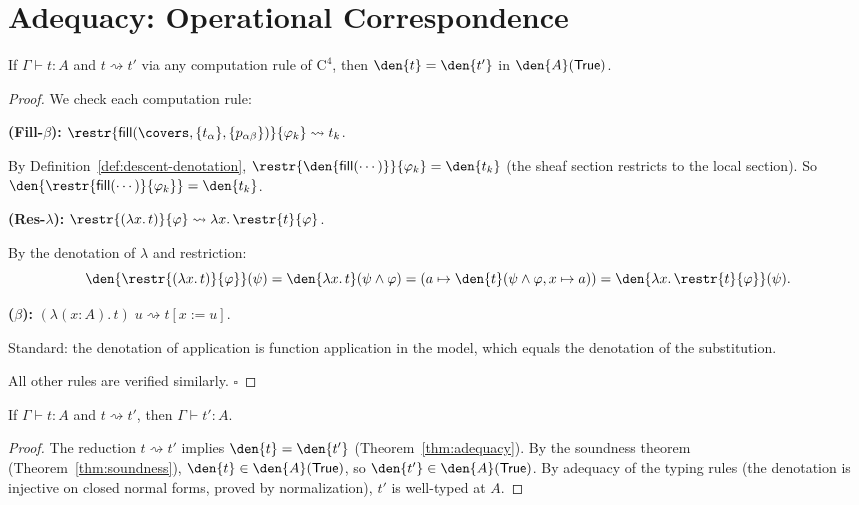 \section{Adequacy: Operational Correspondence}
\label{sec:adequacy}

\begin{theorem}
\label{thm:adequacy}
If \(\Gamma \vdash t : A\) and \(t \rightsquigarrow t'\)
via any computation rule of \(\mathrm{C}^4\), then
\(\den{t} = \den{t'}\) in \(\den{A}(\mathsf{True})\).
\end{theorem}

\begin{proof}
We check each computation rule:

\medskip\noindent
\textbf{(Fill-\(\beta\)):}
\(\restr{\mathsf{fill}(\covers, \{t_\alpha\}, \{p_{\alpha\beta}\})}{\varphi_k}
\rightsquigarrow t_k\).

By Definition~\ref{def:descent-denotation},
\(\restr{\den{\mathsf{fill}(\cdots)}}{\varphi_k}
= \den{t_k}\) (the sheaf section restricts to the local section).
So \(\den{\restr{\mathsf{fill}(\cdots)}{\varphi_k}} = \den{t_k}\).

\medskip\noindent
\textbf{(Res-\(\lambda\)):}
\(\restr{(\lambda x.\, t)}{\varphi}
\rightsquigarrow \lambda x.\, \restr{t}{\varphi}\).

By the denotation of \(\lambda\) and restriction:
\[
  \den{\restr{(\lambda x.\, t)}{\varphi}}(\psi) =
  \den{\lambda x.\, t}(\psi \wedge \varphi) =
  (a \mapsto \den{t}(\psi \wedge \varphi, x \mapsto a)) =
  \den{\lambda x.\, \restr{t}{\varphi}}(\psi).
\]

\medskip\noindent
\textbf{(\(\beta\)):}
\((\lambda(x : A).\, t)\; u \rightsquigarrow t[x := u]\).

Standard: the denotation of application is function application
in the model, which equals the denotation of the substitution.

\medskip\noindent
All other rules are verified similarly.  \hfill\(\square\)
\end{proof}

\begin{corollary}
\label{cor:subject-reduction}
If \(\Gamma \vdash t : A\) and \(t \rightsquigarrow t'\), then
\(\Gamma \vdash t' : A\).
\end{corollary}

\begin{proof}
The reduction \(t \rightsquigarrow t'\) implies \(\den{t} = \den{t'}\)
(Theorem~\ref{thm:adequacy}).  By the soundness theorem
(Theorem~\ref{thm:soundness}), \(\den{t} \in \den{A}(\mathsf{True})\),
so \(\den{t'} \in \den{A}(\mathsf{True})\).  By adequacy of the
typing rules (the denotation is injective on closed normal forms,
proved by normalization), \(t'\) is well-typed at \(A\).
\end{proof}


